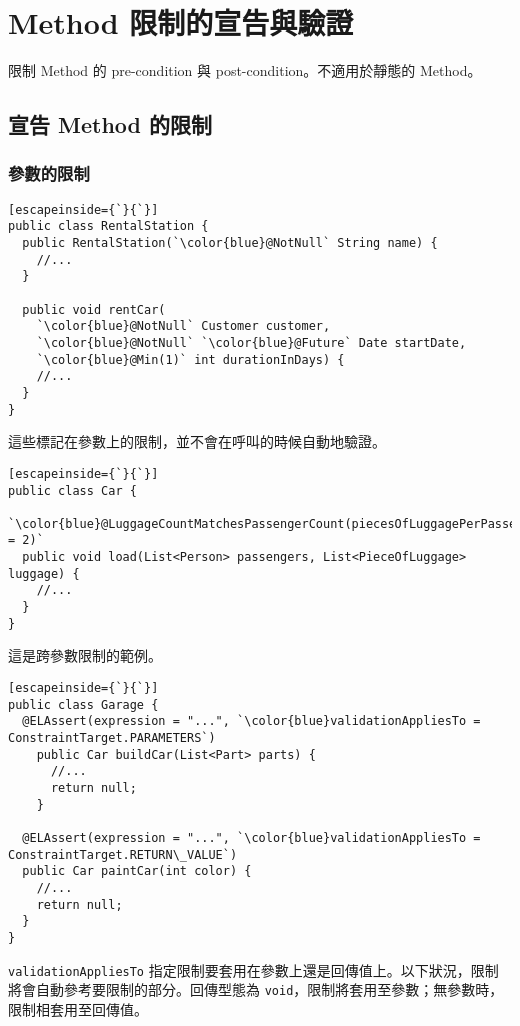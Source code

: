 \chapter{Method 限制的宣告與驗證}

限制 Method 的 pre-condition 與 post-condition。不適用於靜態的 Method。

\section{宣告 Method 的限制}

\subsection{參數的限制}

\begin{lstlisting}[escapeinside={`}{`}]
public class RentalStation {
  public RentalStation(`\color{blue}@NotNull` String name) {
    //...
  }

  public void rentCar(
    `\color{blue}@NotNull` Customer customer,
    `\color{blue}@NotNull` `\color{blue}@Future` Date startDate,
    `\color{blue}@Min(1)` int durationInDays) {
    //...
  }
}
\end{lstlisting}

這些標記在參數上的限制，並不會在呼叫的時候自動地驗證。

\begin{lstlisting}[escapeinside={`}{`}]
public class Car {
  `\color{blue}@LuggageCountMatchesPassengerCount(piecesOfLuggagePerPassenger = 2)`
  public void load(List<Person> passengers, List<PieceOfLuggage> luggage) {
    //...
  }
}
\end{lstlisting}

這是跨參數限制的範例。

\begin{lstlisting}[escapeinside={`}{`}]
public class Garage {
  @ELAssert(expression = "...", `\color{blue}validationAppliesTo = ConstraintTarget.PARAMETERS`)
    public Car buildCar(List<Part> parts) {
      //...
      return null;
    }

  @ELAssert(expression = "...", `\color{blue}validationAppliesTo = ConstraintTarget.RETURN\_VALUE`)
  public Car paintCar(int color) {
    //...
    return null;
  }
}
\end{lstlisting}

\texttt{validationAppliesTo} 指定限制要套用在參數上還是回傳值上。以下狀況，限制將會自動參考要限制的部分。回傳型態為 \texttt{void}，限制將套用至參數；無參數時，限制相套用至回傳值。

